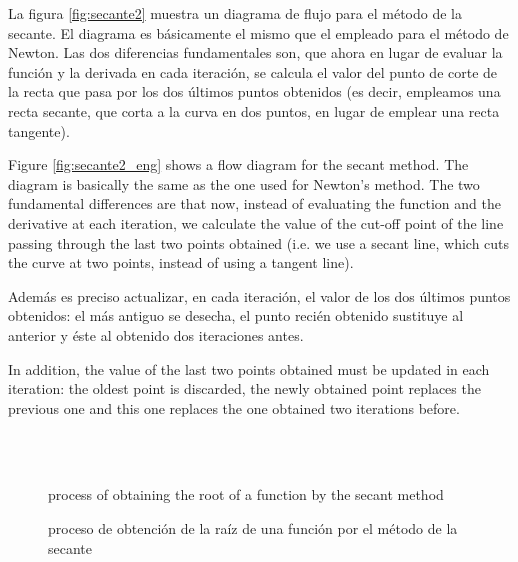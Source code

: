 \begin{paracol}{2}

La figura \ref{fig:secante2} muestra un diagrama de flujo para el método de la secante. El diagrama es básicamente el mismo que el empleado para el método de Newton. Las dos diferencias fundamentales son, que ahora en lugar de evaluar la función y la derivada en cada iteración, se calcula  el valor del punto de corte de la recta que pasa por los dos últimos puntos obtenidos (es decir, empleamos una recta secante, que corta a la curva en dos puntos, en lugar de emplear una recta tangente). 

\switchcolumn
Figure \ref{fig:secante2_eng} shows a flow diagram for the secant method. The diagram is basically the same as the one used for Newton's method. The two fundamental differences are that now, instead of evaluating the function and the derivative at each iteration, we calculate the value of the cut-off point of the line passing through the last two points obtained (i.e. we use a secant line, which cuts the curve at two points, instead of using a tangent line). 

\switchcolumn

Además es preciso actualizar, en cada iteración, el valor de los dos últimos puntos obtenidos: el más antiguo se desecha, el punto recién obtenido sustituye al anterior y éste al obtenido dos iteraciones antes. 

\switchcolumn

In addition, the value of the last two points obtained must be updated in each iteration: the oldest point is discarded, the newly obtained point replaces the previous one and this one replaces the one obtained two iterations before. 


\end{paracol}

\begin{figure}
\centering
{} \qquad
{}\\
\qquad
{}\\
\qquad
{}

\caption{proceso de obtención de la raíz de una función por el método de la secante}{process of obtaining the root of a function by the secant method}
\label{fig:secante3}
\end{figure}

